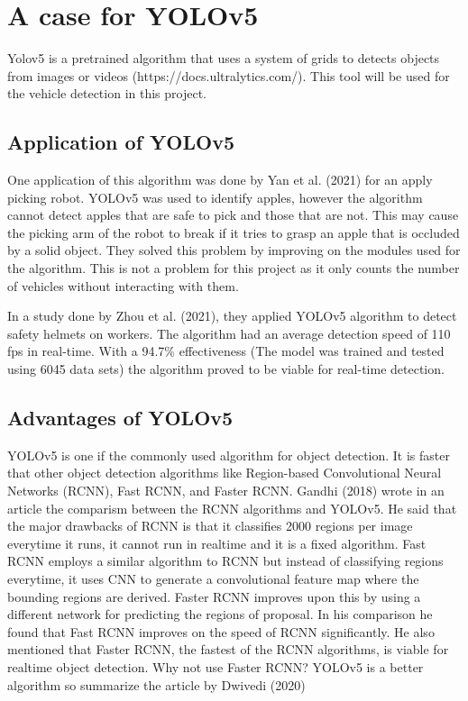 \section{A case for YOLOv5}
	Yolov5 is a pretrained algorithm that uses a system of grids to detects objects from images or videos (https://docs.ultralytics.com/). This tool will be used for the vehicle detection in this project. 

\subsection{Application of YOLOv5}
One application of this algorithm was done by Yan et al. (2021) for an apply picking robot. YOLOv5 was used to identify apples, however the algorithm cannot detect apples that are safe to pick and those that are not. This may cause the picking arm of the robot to break if it tries to grasp an apple that is occluded by a solid object. They solved this problem by improving on the modules used for the algorithm. This is not a problem for this project as it only counts the number of vehicles without interacting with them. 

In a study done by Zhou et al. (2021), they applied YOLOv5 algorithm to detect safety helmets on workers. The algorithm had an average detection speed of 110 fps in real-time. With a 94.7\% effectiveness (The model was trained and tested  using 6045 data sets) the algorithm proved to be viable for real-time detection.

\subsection{Advantages of YOLOv5}
	YOLOv5 is one if the commonly used algorithm for object detection. It is faster that other object detection algorithms like Region-based Convolutional Neural Networks (RCNN), Fast RCNN, and Faster RCNN. Gandhi (2018) wrote in an article the comparism between the RCNN algorithms and YOLOv5. He said that the major drawbacks of RCNN is that it classifies 2000 regions per image everytime it runs, it cannot run in realtime and it is a fixed algorithm. Fast RCNN employs a similar algorithm to RCNN but instead of classifying regions everytime, it uses CNN to generate a convolutional feature map where the bounding regions are derived. Faster RCNN improves upon this by using a different network for predicting the regions of proposal. In his comparison he found that Fast RCNN improves on the speed of RCNN significantly. He also mentioned that Faster RCNN, the fastest of the RCNN algorithms, is viable for realtime object detection. Why not use Faster RCNN? YOLOv5 is a better algorithm so summarize the article by Dwivedi (2020)


